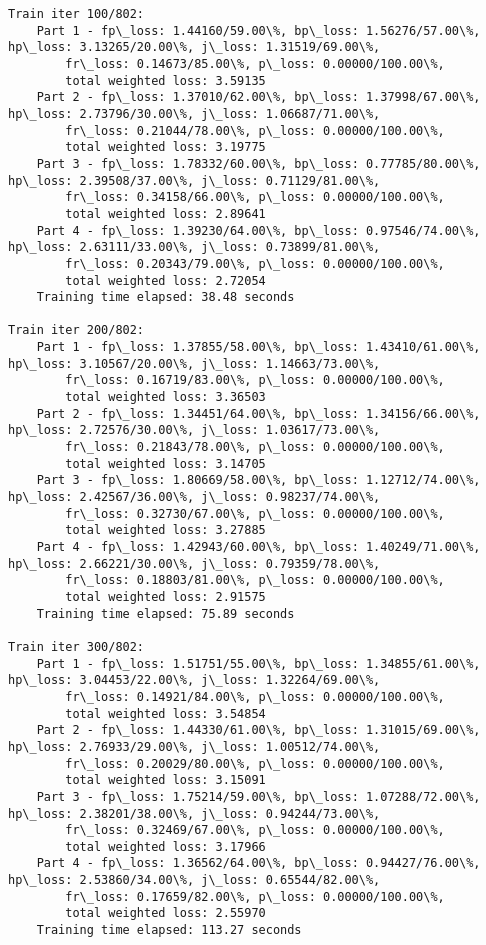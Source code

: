 \documentclass[11pt]{article}
\begin{document}
\begin{Verbatim}[commandchars=\\\{\}]
Train iter 100/802:
	Part 1 - fp\_loss: 1.44160/59.00\%, bp\_loss: 1.56276/57.00\%, hp\_loss: 3.13265/20.00\%, j\_loss: 1.31519/69.00\%, 
		fr\_loss: 0.14673/85.00\%, p\_loss: 0.00000/100.00\%, 
		total weighted loss: 3.59135
	Part 2 - fp\_loss: 1.37010/62.00\%, bp\_loss: 1.37998/67.00\%, hp\_loss: 2.73796/30.00\%, j\_loss: 1.06687/71.00\%, 
		fr\_loss: 0.21044/78.00\%, p\_loss: 0.00000/100.00\%, 
		total weighted loss: 3.19775
	Part 3 - fp\_loss: 1.78332/60.00\%, bp\_loss: 0.77785/80.00\%, hp\_loss: 2.39508/37.00\%, j\_loss: 0.71129/81.00\%, 
		fr\_loss: 0.34158/66.00\%, p\_loss: 0.00000/100.00\%, 
		total weighted loss: 2.89641
	Part 4 - fp\_loss: 1.39230/64.00\%, bp\_loss: 0.97546/74.00\%, hp\_loss: 2.63111/33.00\%, j\_loss: 0.73899/81.00\%, 
		fr\_loss: 0.20343/79.00\%, p\_loss: 0.00000/100.00\%, 
		total weighted loss: 2.72054
	Training time elapsed: 38.48 seconds

Train iter 200/802:
	Part 1 - fp\_loss: 1.37855/58.00\%, bp\_loss: 1.43410/61.00\%, hp\_loss: 3.10567/20.00\%, j\_loss: 1.14663/73.00\%, 
		fr\_loss: 0.16719/83.00\%, p\_loss: 0.00000/100.00\%, 
		total weighted loss: 3.36503
	Part 2 - fp\_loss: 1.34451/64.00\%, bp\_loss: 1.34156/66.00\%, hp\_loss: 2.72576/30.00\%, j\_loss: 1.03617/73.00\%, 
		fr\_loss: 0.21843/78.00\%, p\_loss: 0.00000/100.00\%, 
		total weighted loss: 3.14705
	Part 3 - fp\_loss: 1.80669/58.00\%, bp\_loss: 1.12712/74.00\%, hp\_loss: 2.42567/36.00\%, j\_loss: 0.98237/74.00\%, 
		fr\_loss: 0.32730/67.00\%, p\_loss: 0.00000/100.00\%, 
		total weighted loss: 3.27885
	Part 4 - fp\_loss: 1.42943/60.00\%, bp\_loss: 1.40249/71.00\%, hp\_loss: 2.66221/30.00\%, j\_loss: 0.79359/78.00\%, 
		fr\_loss: 0.18803/81.00\%, p\_loss: 0.00000/100.00\%, 
		total weighted loss: 2.91575
	Training time elapsed: 75.89 seconds

Train iter 300/802:
	Part 1 - fp\_loss: 1.51751/55.00\%, bp\_loss: 1.34855/61.00\%, hp\_loss: 3.04453/22.00\%, j\_loss: 1.32264/69.00\%, 
		fr\_loss: 0.14921/84.00\%, p\_loss: 0.00000/100.00\%, 
		total weighted loss: 3.54854
	Part 2 - fp\_loss: 1.44330/61.00\%, bp\_loss: 1.31015/69.00\%, hp\_loss: 2.76933/29.00\%, j\_loss: 1.00512/74.00\%, 
		fr\_loss: 0.20029/80.00\%, p\_loss: 0.00000/100.00\%, 
		total weighted loss: 3.15091
	Part 3 - fp\_loss: 1.75214/59.00\%, bp\_loss: 1.07288/72.00\%, hp\_loss: 2.38201/38.00\%, j\_loss: 0.94244/73.00\%, 
		fr\_loss: 0.32469/67.00\%, p\_loss: 0.00000/100.00\%, 
		total weighted loss: 3.17966
	Part 4 - fp\_loss: 1.36562/64.00\%, bp\_loss: 0.94427/76.00\%, hp\_loss: 2.53860/34.00\%, j\_loss: 0.65544/82.00\%, 
		fr\_loss: 0.17659/82.00\%, p\_loss: 0.00000/100.00\%, 
		total weighted loss: 2.55970
	Training time elapsed: 113.27 seconds


\end{Verbatim}
\end{document}
